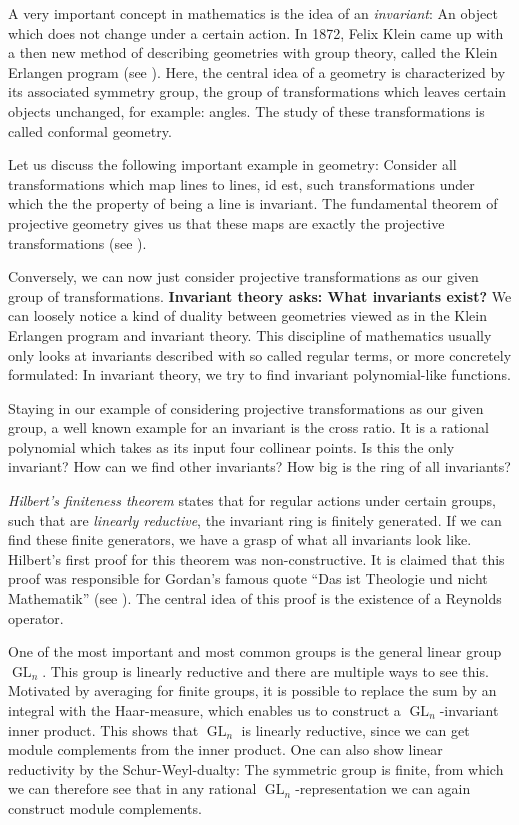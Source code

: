 A very important concept in mathematics is the idea of an \textit{invariant}:
An object which does not change under a certain action.
In 1872, Felix Klein came up with a then new method of describing geometries with group theory, called the Klein Erlangen program (see \cite{Kle93}).
Here, the central idea of a geometry is characterized by its associated symmetry group, the group of transformations which leaves certain objects unchanged, for example: angles.
The study of these transformations is called conformal geometry.

Let us discuss the following important example in geometry:
Consider all transformations which map lines to lines, id est, such transformations under which the the property of being a line is invariant.
The fundamental theorem of projective geometry gives us that these maps are exactly the projective transformations (see \cite[Ex V.44,~Ex I.51]{Aud03}).

Conversely, we can now just consider projective transformations as our given group of transformations.
\textbf{Invariant theory asks: What invariants exist?}
We can loosely notice a kind of duality between geometries viewed as in the Klein Erlangen program and invariant theory.
This discipline of mathematics usually only looks at invariants described with so called regular terms, or more concretely formulated:  In invariant theory, we try to find invariant polynomial-like functions.

Staying in our example of considering projective transformations as our given group, a well known example for an invariant is the cross ratio.
It is a rational polynomial which takes as its input four collinear points.
Is this the only invariant?
How can we find other invariants?
How big is the ring of all invariants?

\textit{Hilbert's finiteness theorem} states that for regular actions under certain groups, such that are \textit{linearly reductive}, the invariant ring is finitely generated.
If we can find these finite generators, we have a grasp of what all invariants look like.
Hilbert's first proof for this theorem was non-constructive.
It is claimed that this proof was responsible for Gordan's famous quote ``Das ist Theologie und nicht Mathematik'' (see \cite[p.42]{DK15}).
The central idea of this proof is the existence of a Reynolds operator.

One of the most important and most common groups is the general linear group $\operatorname{GL}_n$.
This group is linearly reductive and there are multiple ways to see this.
Motivated by averaging for finite groups, it is possible to replace the sum by an integral with the Haar-measure, which enables us to construct a $\operatorname{GL}_n$-invariant inner product.
This shows that $\operatorname{GL}_n$ is linearly reductive, since we can get module complements from the inner product.
One can also show linear reductivity by the Schur-Weyl-dualty:  The symmetric group is finite, from which we can therefore see that in any rational $\operatorname{GL}_n$-representation we can again construct module complements.

